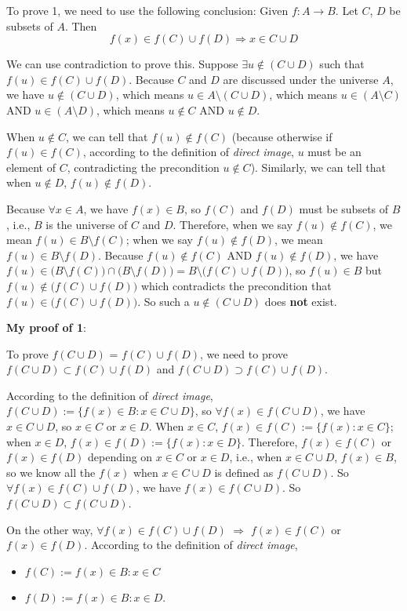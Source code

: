 \documentclass[12pt, letterpaper, oneside]{book}
\begin{document}
To prove 1, we need to use the following conclusion: Given $f: A \rightarrow B$.
Let $C$, $D$ be subsets of $A$. Then \[f(x) \in f(C) \cup f(D) \Rightarrow
  x \in C \cup D\]

We can use contradiction to prove this. Suppose $\exists u \notin (C \cup D)$
such that $f(u) \in f(C) \cup f(D)$. Because $C$ and $D$ are discussed under
the universe $A$, we have $u \notin (C \cup D)$, which means $u \in A \setminus
  (C \cup D)$, which means $u \in (A \setminus C)$ AND $u \in (A \setminus D)$,
which means $u \notin C$ AND $u \notin D$.

When $u \notin C$, we can tell that $f(u) \notin f(C)$ (because otherwise if
$f(u) \in f(C)$, according to the definition of \textit{direct image}, $u$ must
be an element of $C$, contradicting the precondition $u \notin C$). Similarly,
we can tell that when $u \notin D$, $f(u) \notin f(D)$.

Because $\forall x \in A$, we have $f(x) \in B$, so $f(C)$ and $f(D)$ must be
subsets of $B$, i.e., $B$ is the universe of $C$ and $D$. Therefore, when we
say $f(u) \notin f(C)$, we mean $f(u) \in B \setminus f(C)$; when we say $f(u)
  \notin f(D)$, we mean $f(u) \in B \setminus f(D)$. Because $f(u) \notin f(C)$
AND $f(u) \notin f(D)$, we have $f(u) \in \bigl(B \setminus f(C)\bigr) \cap
  \bigl(B \setminus f(D)\bigr) = B \setminus \bigl(f(C) \cup f(D)\bigr)$, so
$f(u) \in B$ but $f(u) \notin \bigl(f(C) \cup f(D)\bigr)$ which contradicts
the precondition that $f(u) \in \bigl(f(C) \cup f(D)\bigr)$. So such a $u
  \notin (C \cup D)$ does \textbf{not} exist.

\textbf{My proof of 1}:

To prove $f(C \cup D)$ = $f(C) \cup f(D)$, we need to prove $f(C \cup D)
  \subset f(C) \cup f(D)$ and $f(C \cup D) \supset f(C) \cup f(D)$.

According to the definition of \textit{direct image}, $f(C \cup D) := \{f(x)
  \in B: x \in C \cup D\}$, so $\forall f(x) \in f(C \cup D)$, we have $x \in C
  \cup D$, so $x \in C$ or $x \in D$. When $x \in C$, $f(x) \in f(C) := \{f(x): x
  \in C\}$; when $x \in D$, $f(x) \in f(D) := \{f(x): x \in D\}$. Therefore, $f(x)
  \in f(C)$ or $f(x) \in f(D)$ depending on $x \in C$ or $x \in D$, i.e., when $x
  \in C \cup D$, $f(x) \in B$, so we know all the $f(x)$ when $x \in C \cup D$ is
defined as $f(C \cup D)$. So $\forall f(x) \in f(C) \cup f(D)$, we have $f(x)
  \in f(C \cup D)$. So $f(C \cup D) \subset f(C \cup D)$.

On the other way, $\forall f(x) \in f(C) \cup f(D)$ $\Rightarrow$ $f(x) \in
  f(C)$ or $f(x) \in f(D)$. According to the definition of \textit{direct image},
\begin{itemize}
  \item $f(C) := {f(x) \in B: x \in C}$
  \item $f(D) := {f(x) \in B: x \in D}$.
\end{itemize}
\end{document}
